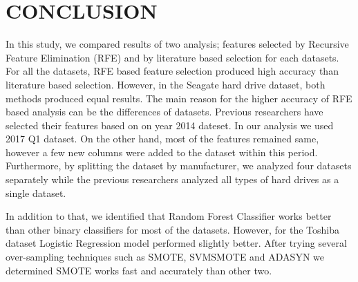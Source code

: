 \documentclass[conference]{IEEEtran}
\begin{document}
\section{CONCLUSION}

In this study, we compared results of two analysis; features selected by Recursive Feature Elimination (RFE) and by literature based selection for each datasets. For all the datasets, RFE based feature selection produced high accuracy than literature based selection. However, in the Seagate hard drive dataset, both methods produced equal results. The main reason for the higher accuracy of RFE based analysis can be the differences of datasets. Previous researchers have selected their features based on on year 2014 dateset. In our analysis we used 2017 Q1 dataset. On the other hand, most of the features remained same, however a few new columns were added to the dataset within this period. Furthermore, by splitting the dataset by manufacturer, we analyzed four datasets separately while the previous researchers analyzed all types of hard drives as a single dataset.

In addition to that, we identified that Random Forest Classifier works better than other binary classifiers for most of the datasets. However, for the Toshiba dataset Logistic Regression model performed slightly better. After trying several over-sampling techniques such as SMOTE, SVMSMOTE and ADASYN we determined SMOTE works fast and accurately than other two.
\end{document}
